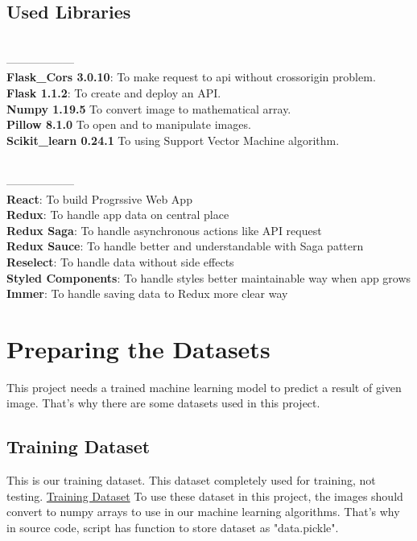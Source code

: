 \documentclass[onecolumn]{article}
\begin{document}
\subsection{Used Libraries}
 \\ ------------------ \\ 
\textbf{Flask\_Cors 3.0.10}: To make request to api without crossorigin problem. \\ 
\textbf{Flask 1.1.2}: To create and deploy an API. \\ 
\textbf{Numpy 1.19.5} To convert image to mathematical array. \\
\textbf{Pillow 8.1.0} To open and to manipulate images. \\
\textbf{Scikit\_learn 0.24.1} To using Support Vector Machine algorithm. \\

\newline
\newline

 \\ ------------------ \\
\textbf{React}: To build Progrssive Web App \\
\textbf{Redux}: To handle app data on central place  \\
\textbf{Redux Saga}: To handle asynchronous actions like API request \\
\textbf{Redux Sauce}: To handle better and understandable with Saga pattern  \\
\textbf{Reselect}: To handle data without side effects \\
\textbf{Styled Components}: To handle styles better maintainable way when app grows \\
\textbf{Immer}: To handle saving data to Redux more clear way \\


\section{Preparing the Datasets}
This project needs a trained machine learning model to predict a result of given image. That's why there are some datasets used in this project.
\subsection{Training Dataset}
This is our training dataset. This dataset completely used for training, not testing.
\newline
\href{https://www.kaggle.com/chetankv/dogs-cats-images}{Training Dataset}
\newline
\newline
To use these dataset in this project, the images should convert to numpy arrays to use in our machine learning algorithms. That's why in source code,  script has  function to store dataset as "data.pickle".
\end{document}
